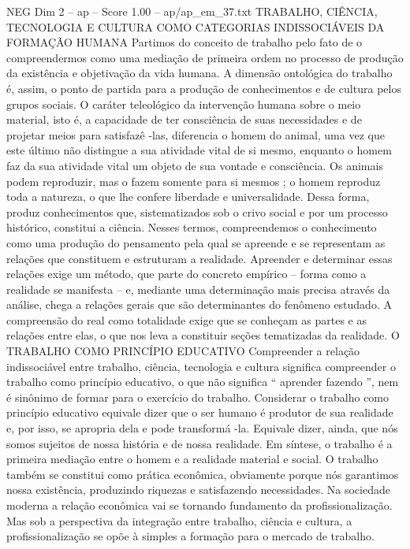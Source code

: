 \begin{textsample}{NEG Dim 2 – ap – Score 1.00 – ap/ap\_em\_37.txt}  \label{ex:f2_neg_147}
TRABALHO, CIÊNCIA, TECNOLOGIA E CULTURA COMO CATEGORIAS INDISSOCIÁVEIS DA FORMAÇÃO HUMANA Partimos do conceito de trabalho pelo fato de o compreendermos como uma mediação de primeira ordem no processo de produção da existência e objetivação da vida humana.
A dimensão ontológica do trabalho é, assim, o ponto de partida para a produção de conhecimentos e de cultura pelos grupos sociais.
O caráter teleológico da intervenção humana sobre o meio material, isto é, a capacidade de ter consciência de suas necessidades e de projetar meios para satisfazê -las, diferencia o homem do animal, uma vez que este último não distingue a sua atividade vital de si mesmo, enquanto o homem faz da sua atividade vital um objeto de sua vontade e consciência.
Os animais podem reproduzir, mas o fazem somente para si mesmos ; o homem reproduz toda a natureza, o que lhe confere liberdade e universalidade.
Dessa forma, produz conhecimentos que, sistematizados sob o crivo social e por um processo histórico, constitui a ciência.
Nesses termos, compreendemos o conhecimento como uma produção do pensamento pela qual se apreende e se representam as relações que constituem e estruturam a realidade.
Apreender e determinar essas relações exige um método, que parte do concreto empírico – forma como a realidade se manifesta – e, mediante uma determinação mais precisa através da análise, chega a relações gerais que são determinantes do fenômeno estudado.
A compreensão do real como totalidade exige que se conheçam as partes e as relações entre elas, o que nos leva a constituir seções tematizadas da realidade.
O TRABALHO COMO PRINCÍPIO EDUCATIVO Compreender a relação indissociável entre trabalho, ciência, tecnologia e cultura significa compreender o trabalho como princípio educativo, o que não significa “ aprender fazendo ”, nem é sinônimo de formar para o exercício do trabalho.
Considerar o trabalho como princípio educativo equivale dizer que o ser humano é produtor de sua realidade e, por isso, se apropria dela e pode transformá -la.
Equivale dizer, ainda, que nós somos sujeitos de nossa história e de nossa realidade.
Em síntese, o trabalho é a primeira mediação entre o homem e a realidade material e social.
O trabalho também se constitui como prática econômica, obviamente porque nós garantimos nossa existência, produzindo riquezas e satisfazendo necessidades.
Na sociedade moderna a relação econômica vai se tornando fundamento da profissionalização.
Mas sob a perspectiva da integração entre trabalho, ciência e cultura, a profissionalização se opõe à simples a formação para o mercado de trabalho.

\end{textsample}
